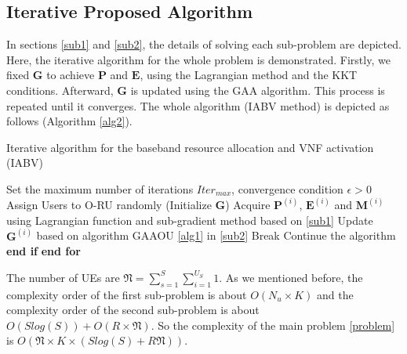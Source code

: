 \documentclass[conference]{IEEEtran}
\begin{document}
\subsection{Iterative Proposed Algorithm}
In sections \eqref{sub1} and \eqref{sub2}, the details of solving each sub-problem are depicted. 
Here, the iterative algorithm for the whole problem is demonstrated.
Firstly, we fixed $\boldsymbol{G}$ to achieve $\boldsymbol{P}$ and $\boldsymbol{E}$, using the Lagrangian method and the KKT conditions.  
Afterward, $\boldsymbol{G}$ is updated using the GAA algorithm. This process is repeated until it converges. 
The whole algorithm (IABV method) is depicted as follows (Algorithm \ref{alg2}).
 \begin{algorithm}
\caption{Iterative algorithm for the baseband resource allocation and VNF activation (IABV)}\label{alg2}
\begin{algorithmic}[1]
\State  Set the maximum number of iterations ${Iter}_{max}$, convergence condition $\epsilon > 0$ \label{a21}
\State  Assign Users to O-RU randomly (Initialize $\boldsymbol{G}$) \label{a22}
\label{23}
\State Acquire $\boldsymbol{P}^{(i)}$, $\boldsymbol{E}^{(i)}$ and $\boldsymbol{M}^{(i)}$ using Lagrangian function and sub-gradient method based on \eqref{sub1}
\State Update $\boldsymbol{G}^{(i)}$   based on algorithm GAAOU \eqref{alg1} in  \eqref{sub2}
\State Break
\Else 
\State Continue the algorithm  
\EndIf
\State \textbf{end if}
\EndFor
\State \textbf{end for} \label{24}
\end{algorithmic}
\end{algorithm}
The number of UEs are $\mathfrak{N} = \sum_{s=1}^{S}\sum_{i=1}^{U_S}1$.
As we mentioned before, the complexity order of the first sub-problem is about $O(N_u \times K)$
and the complexity order of the second sub-problem is about $O(Slog(S)) + O(R\times \mathfrak{N})$.
So the complexity of the main problem \eqref{problem} is $O(\mathfrak{N} \times K \times (Slog(S)+R\mathfrak{N}))$.
\end{document}
